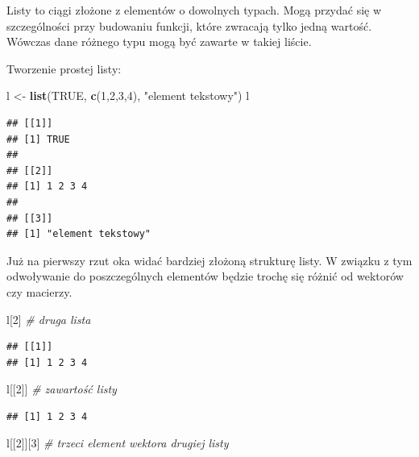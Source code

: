 \documentclass[]{book}
\newenvironment{Shaded}{\begin{snugshade}}{\end{snugshade}}
\newcommand{\KeywordTok}[1]{\textcolor[rgb]{0.13,0.29,0.53}{\textbf{#1}}}
\newcommand{\DecValTok}[1]{\textcolor[rgb]{0.00,0.00,0.81}{#1}}
\newcommand{\StringTok}[1]{\textcolor[rgb]{0.31,0.60,0.02}{#1}}
\newcommand{\CommentTok}[1]{\textcolor[rgb]{0.56,0.35,0.01}{\textit{#1}}}
\newcommand{\OtherTok}[1]{\textcolor[rgb]{0.56,0.35,0.01}{#1}}
\newcommand{\NormalTok}[1]{#1}
\begin{document}
Listy to ciągi złożone z elementów o dowolnych typach. Mogą przydać się
w szczególności przy budowaniu funkcji, które zwracają tylko jedną
wartość. Wówczas dane różnego typu mogą być zawarte w takiej liście.

Tworzenie prostej listy:

\begin{Shaded}
\begin{Highlighting}[]
\NormalTok{l <-}\StringTok{ }\KeywordTok{list}\NormalTok{(}\OtherTok{TRUE}\NormalTok{, }\KeywordTok{c}\NormalTok{(}\DecValTok{1}\NormalTok{,}\DecValTok{2}\NormalTok{,}\DecValTok{3}\NormalTok{,}\DecValTok{4}\NormalTok{), }\StringTok{"element tekstowy"}\NormalTok{)}
\NormalTok{l}
\end{Highlighting}
\end{Shaded}

\begin{verbatim}
## [[1]]
## [1] TRUE
## 
## [[2]]
## [1] 1 2 3 4
## 
## [[3]]
## [1] "element tekstowy"
\end{verbatim}

Już na pierwszy rzut oka widać bardziej złożoną strukturę listy. W
związku z tym odwoływanie do poszczególnych elementów będzie trochę się
różnić od wektorów czy macierzy.

\begin{Shaded}
\begin{Highlighting}[]
\NormalTok{l[}\DecValTok{2}\NormalTok{] }\CommentTok{# druga lista}
\end{Highlighting}
\end{Shaded}

\begin{verbatim}
## [[1]]
## [1] 1 2 3 4
\end{verbatim}

\begin{Shaded}
\begin{Highlighting}[]
\NormalTok{l[[}\DecValTok{2}\NormalTok{]] }\CommentTok{# zawartość listy}
\end{Highlighting}
\end{Shaded}

\begin{verbatim}
## [1] 1 2 3 4
\end{verbatim}

\begin{Shaded}
\begin{Highlighting}[]
\NormalTok{l[[}\DecValTok{2}\NormalTok{]][}\DecValTok{3}\NormalTok{] }\CommentTok{# trzeci element wektora drugiej listy}
\end{Highlighting}
\end{Shaded}
\end{document}
